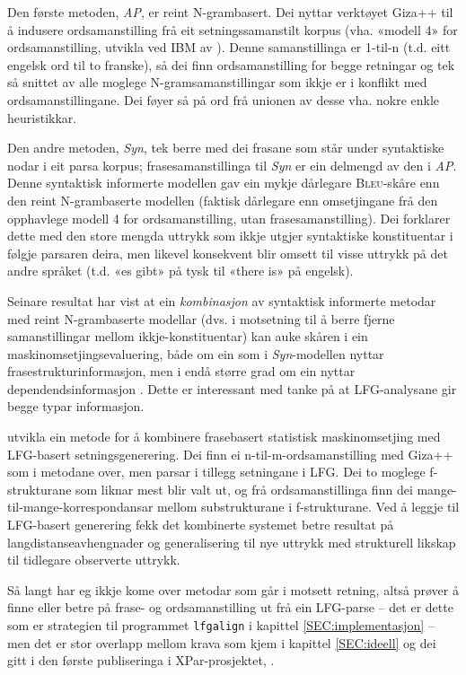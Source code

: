 \documentclass[11pt,a4paper,oneside,draft]{book}
\newcommand{\Bleu}{\textsc{Bleu}}
\begin{document}
Den første metoden, \emph{AP}, er reint N-grambasert. Dei nyttar verktøyet
Giza++ \citep[Och~og~Ney,~2000,~i][s.~50]{koehn2003spb} til å indusere
ordsamanstilling frå eit setningssamanstilt korpus (vha. «modell 4»
for ordsamanstilling, utvikla ved IBM av \citet{brown1993msm}). Denne
samanstillinga er 1-til-n (t.d. eitt engelsk ord til to franske), så
dei finn ordsamanstilling for begge retningar og tek så snittet av alle
moglege N-gramsamanstillingar som ikkje er i konflikt med
ordsamanstillingane. Dei føyer så på ord frå unionen av desse
vha. nokre enkle heuristikkar.

Den andre metoden, \emph{Syn}, tek berre med dei frasane som står under
syntaktiske nodar i eit parsa korpus; frasesamanstillinga til \emph{Syn} er
ein delmengd av den i \emph{AP}. Denne syntaktisk informerte modellen gav
ein mykje dårlegare \Bleu-skåre enn den reint N-grambaserte modellen
(faktisk dårlegare enn omsetjingane frå den opphavlege modell 4 for
ordsamanstilling, utan frasesamanstilling). Dei forklarer dette med
den store mengda uttrykk som ikkje utgjer syntaktiske konstituentar i
følgje parsaren deira, men likevel konsekvent blir omsett til visse
uttrykk på det andre språket (t.d. «es gibt» på tysk til «there is» på
engelsk).

Seinare resultat har vist at ein \emph{kombinasjon} av syntaktisk
informerte metodar med reint N-grambaserte modellar (dvs. i motsetning
til å berre fjerne samanstillingar mellom ikkje-konstituentar) kan
auke skåren i ein maskinomsetjingsevaluering, både om ein som i
\emph{Syn}-modellen nyttar frasestrukturinformasjon, men i endå større
grad om ein nyttar dependendsinformasjon
\citep{tinsley2007ept,hearne2008ccd}. Dette er interessant med tanke
på at LFG-analysane gir begge typar informasjon.

\citet{riezler2006gmt} utvikla ein metode for å kombinere frasebasert
statistisk maskinomsetjing med LFG-basert setningsgenerering. Dei finn
ei n-til-m-ordsamanstilling med Giza++ som i metodane over, men parsar
i tillegg setningane i LFG. Dei to moglege f-strukturane som liknar
mest blir valt ut, og frå ordsamanstillinga finn dei
mange-til-mange-korrespondansar mellom substrukturane i
f-strukturane. Ved å leggje til LFG-basert generering fekk det
kombinerte systemet betre resultat på langdistanseavhengnader og
generalisering til nye uttrykk med strukturell likskap til tidlegare
observerte uttrykk.

Så langt har eg ikkje kome over metodar som går i motsett retning,
altså prøver å finne eller betre på frase- og ordsamanstilling ut frå
ein LFG-parse -- det er dette som er strategien til programmet
\texttt{lfgalign} i kapittel \ref{SEC:implementasjon} -- men det er stor
overlapp mellom krava som kjem i kapittel \ref{SEC:ideell} og dei gitt
i den første publiseringa i XPar-prosjektet, \citet{dyvik2009lmp}.
\end{document}
